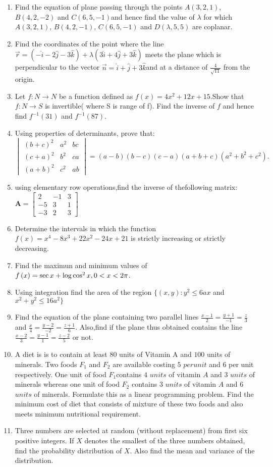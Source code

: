 \documentclass[12pt,-letter paper]{article}
\let\vec\mathbf{}
\let\vec\mathbf{}
\let\vec\mathbf{}
\providecommand{\mydet}[1]{\ensuremath{\begin{vmatrix}#1\end{vmatrix}}}
\providecommand{\myvec}[1]{\ensuremath{\begin{bmatrix}#1\end{bmatrix}}}
\providecommand{\brak}[1]{\ensuremath{\left(#1\right)}}
\begin{document}
\begin{enumerate}
\item Find the equation of plane passing through the points $A(3,2,1)$, $B(4,2,-2)$ and $C(6,5,-1)$and hence find the value of $\lambda$ for which $A(3,2,1)$, $B(4,2,-1)$, $C(6,5,-1)$ and $D(\lambda,5,5)$ are coplanar. 
\item Find the coordinates of the point where the line 
$\overset{\rightarrow}{r} = (-\hat{i} - 2\hat{j} - 3\hat{k}) + \lambda (3\hat{i} + 4\hat{j} + 3\hat{k})$
		meets the plane which is perpendicular to the vector $\overset{\rightarrow}{n} = \hat{i} + \hat{j} + 3\hat{k}$and at a distance of \(\frac{4}{\sqrt{11}}\) from the origin.
\item Let $f : N \rightarrow N$ be a function defined as $f(x)= 4x^{2}+12x+15$.Show that $f:N \rightarrow S$ is invertible( where S is range of f). Find the inverse of $f$ and hence find $f^{-1}(31)$ and $f^{-1}(87)$.
\item Using properties of determinants, prove that:\\
$\mydet{(b+c)^2 & a^2 & bc \\ (c+a)^2 & b^2 & ca \\ (a+b)^2 & c^2 & ab} = 
\brak{a-b}\brak{b-c}\brak{c-a}\brak{a+b+c}\brak{a^2+b^2+c^2}.$
\item using elementary row operations,find the inverse of thefollowing matrix:$\vec{A}=\myvec{2  & -1 & 3 \\ -5 & 3 & 1 \\ -3 & 2 & 3}$
\item Determine  the intervals in which the function$f\brak{x}=x^{4}-8x^{3}+22x^{2}-24x+21$ is  strictly increasing or strictly decreasing.
\item Find the maximun and minimum values of $f\brak{x}= \sec{x} + \log \cos^{2}x,\\ 0<x<2\pi$.
\item Using integration find the area of the region $\{(x,y):y^2\leq6ax$ and $x^2+y^2\leq16a^2\}$
\item  Find the equation of the plane containing two parallel lines $\frac{x-1}{2}=\frac{y+1}{-1}=\frac{z}{3}$ and $\frac{x}{4}=\frac{y-2}{-2}=\frac{z+1}{6}.$ Also,find if the plane thus obtained contains the line $\frac{x-2}{3}=\frac{y-1}{1}=\frac{z-2}{5}$ or not. 
\item A diet is is to contain at least $80$ units of Vitamin A and $100$ units of minerals. Two foods $F_1$ and $F_2$ are available costing \rupee$5$ $per unit$ and \rupee$6$ per unit respectively. One unit of food $F_1$contains $4$ $units$ of vitamin $A$ and $3$ $units$ of minerals whereas one unit of food $F_2$ contains $3$ $units$ of vitamin $A$ and $6$ $units$ of minerals. Formulate this as a linear programming problem. Find the minimum cost of diet that consists of mixture of these two foods and also meets minimum nutritional requirement.
\item Three numbers are selected at random (without replacement) from first six positive integers. If $X$ denotes the smallest of the three numbers obtained, find the probability distribution of $X$. Also find the mean and variance of the distribution.
\end{enumerate}
\end{document}

